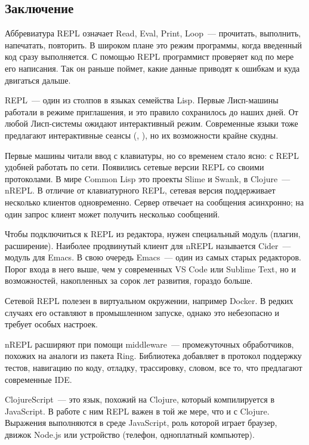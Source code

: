 \subsection{Заключение}

Аббревиатура REPL означает Read, Eval, Print, Loop~--- прочитать, выполнить, напечатать, повторить. В широком плане это режим программы, когда введенный код сразу выполняется. С помощью REPL программист проверяет код по мере его написания. Так он раньше поймет, какие данные приводят к ошибкам и куда двигаться дальше.

REPL~--- один из столпов в языках семейства Lisp. Первые Лисп-машины работали в режиме приглашения, и это правило сохранилось до наших дней. От любой Лисп-системы ожидают интерактивный режим. Современные языки тоже предлагают интерактивные сеансы (, ), но их возможности крайне скудны.

Первые машины читали ввод с клавиатуры, но со временем стало ясно: с REPL удобней работать по сети. Появились сетевые версии REPL со своими протоколами. В мире Common Lisp это проекты Slime и Swank, в Clojure~--- nREPL. В отличие от клавиатурного REPL, сетевая версия поддерживает несколько клиентов одновременно. Сервер отвечает на сообщения асинхронно; на один запрос клиент может получить несколько сообщений.

Чтобы подключиться к REPL из редактора, нужен специальный модуль (плагин, расширение). Наиболее продвинутый клиент для nREPL называется Cider~--- модуль для Emacs. В свою очередь Emacs~--- один из самых старых редакторов. Порог входа в него выше, чем у современных VS Code или Sublime Text, но и возможностей, накопленных за сорок лет развития, гораздо больше.

Сетевой REPL полезен в виртуальном окружении, например Docker. В редких случаях его оставляют в промышленном запуске, однако это небезопасно и требует особых настроек.

nREPL расширяют при помощи middleware~--- промежуточных обработчиков, похожих на аналоги из пакета Ring. Библиотека  добавляет в протокол поддержку тестов, навигацию по коду, отладку, трассировку, словом, все то, что предлагают современные IDE.

ClojureScript~--- это язык, похожий на Clojure, который компилируется в JavaScript. В работе с ним REPL важен в той же мере, что и с Clojure. Выражения выполняются в среде JavaScript, роль которой играет браузер, движок Node.js или устройство (телефон, одноплатный компьютер).

